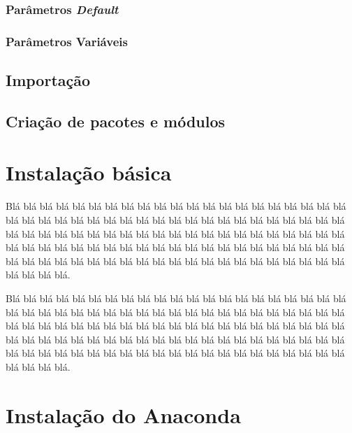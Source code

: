\documentclass[
]{book}
\begin{document}
\hypertarget{modul-funcao-default}{%
\subsection{\texorpdfstring{Parâmetros \emph{Default}}{Parâmetros Default}}\label{modul-funcao-default}}

\hypertarget{modul-funcao-var}{%
\subsection{Parâmetros Variáveis}\label{modul-funcao-var}}

\hypertarget{modul-import}{%
\section{Importação}\label{modul-import}}

\hypertarget{modul-packa}{%
\section{Criação de pacotes e módulos}\label{modul-packa}}

\hypertarget{appendix-apuxeandices}{%
\appendix}


\hypertarget{instalauxe7uxe3o-buxe1sica}{%
\chapter{Instalação básica}\label{instalauxe7uxe3o-buxe1sica}}

Blá blá blá blá blá blá blá blá blá blá blá blá blá blá blá blá blá blá blá blá blá blá blá blá blá blá blá blá blá blá blá blá blá blá blá blá blá blá blá blá blá blá blá blá blá blá blá blá blá blá blá blá blá blá blá blá blá blá blá blá blá blá blá blá blá blá blá blá blá blá blá blá blá blá blá blá blá blá blá blá blá blá blá blá blá blá blá blá blá blá blá blá blá blá blá blá blá blá blá blá blá blá blá blá blá blá blá blá blá.

Blá blá blá blá blá blá blá blá blá blá blá blá blá blá blá blá blá blá blá blá blá blá blá blá blá blá blá blá blá blá blá blá blá blá blá blá blá blá blá blá blá blá blá blá blá blá blá blá blá blá blá blá blá blá blá blá blá blá blá blá blá blá blá blá blá blá blá blá blá blá blá blá blá blá blá blá blá blá blá blá blá blá blá blá blá blá blá blá blá blá blá blá blá blá blá blá blá blá blá blá blá blá blá blá blá blá blá blá blá.

\hypertarget{instalauxe7uxe3o-do-anaconda}{%
\chapter{Instalação do Anaconda}\label{instalauxe7uxe3o-do-anaconda}}
\end{document}
